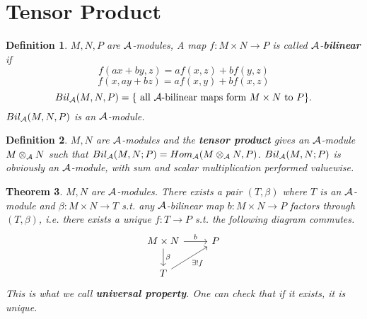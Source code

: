 \documentclass[11pt]{article}
\newtheorem{thm}{Theorem}[section]
\newtheorem{dfn}[thm]{Definition}
\newcommand{\cala}{{\cal A}}
\newcommand{\lrta}{\longrightarrow}
\begin{document}
\section*{Tensor Product}
\begin{dfn}
$M,N,P$  are $\cala$-modules, A map $f:M\times N\lrta P$ is called $\cala$-\textbf{bilinear} if 
$$
f(ax+by, z)=af(x,z)+bf(y,z)
$$
$$
f(x,ay+bz)=a f(x,y)+bf(x,z)
$$
$$
Bil_{\cala}(M,N,P)=\{\text{ all $\cala$-bilinear maps form $M\times N$ to $P$}\}.
$$
$Bil_{\cala}(M,N,P)$ is an $\cala$-module.
\end{dfn}

\begin{dfn}\label{def:tensor_product}
$M,N$ are $\cala$-modules and the \textbf{tensor product} gives an $\cala$-module $M\otimes_\cala N$ such that $Bil_\cala(M,N;P)=Hom_{\cala}(M\otimes_\cala N,P)$. $Bil_\cala(M,N;P)$ is obviously an $\cala$-module, with sum and scalar multiplication performed valuewise.
\end{dfn}

\begin{thm}
$M,N$ are $\cala$-modules. There exists a pair $(T,\beta)$ where $T$ is an $\cala$-module and $\beta:M\times N\lrta T$ s.t.  any $\cala$-bilinear map $b:M\times N\lrta P$ factors through $(T,\beta)$, i.e. there exists a unique $f:T\lrta P$ s.t. the following  diagram commutes.
\[
\begin{tikzcd}
 M\times N \arrow[d,"\beta"] \ar[r,"b"] & P \\
T\arrow[swap,ur,"\exists !f"] &    
\end{tikzcd}
\]
This is what we call \textbf{universal property}. One can check that if it exists, it is unique.
\end{thm}
\end{document}

